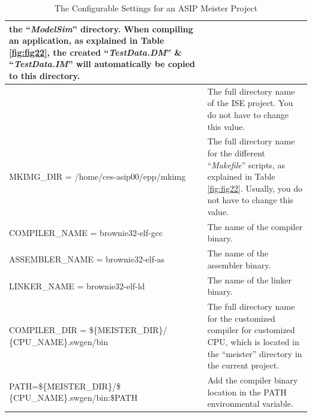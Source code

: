 \begin{table}[!htb]
\begin{tabular}{|p{6cm}|p{11cm}|}
		the ``\emph{ModelSim}'' directory. When compiling an application, as
		explained in Table \ref{fig:fig22}, the created
		``\emph{TestData.DM}'' \& ``\emph{TestData.IM}'' will automatically be
		copied to this directory.
		\\ \hline
		\vtop{\hbox{\strut ISE\_DIR =
				\$\{PROJECT\_}\hbox{\strut DIR\}/\$\{ISE\_NAME \}}} & The full directory
		name of the ISE project. You do not have to change this
		value.
		\\ \hline
		MKIMG\_DIR = /home/ces-asip00/epp/mkimg & The full directory name for the
		different ``\emph{Makefile}'' scripts, as explained in
		Table \ref{fig:fig22}. Usually, you do not have to
		change this value.
		\\ \hline
		COMPILER\_NAME = brownie32-elf-gcc & The name of the compiler
		binary.
		\\ \hline
		ASSEMBLER\_NAME = brownie32-elf-as & The name of the assembler
		binary.
		\\ \hline
		LINKER\_NAME = brownie32-elf-ld & The name of the linker
		binary.
		\\ \hline
		COMPILER\_DIR = \$\{MEISTER\_DIR\}/ \{CPU\_NAME\}.swgen/bin & The full
		directory name for the customized compiler for customized CPU, which is
		located in the ``meister'' directory in the current
		project.
		\\ \hline
		PATH=\$\{MEISTER\_DIR\}/\$ \{CPU\_NAME\}.swgen/bin:\$PATH & Add the
		compiler binary location in the PATH environmental
		variable.
		\\ \hline
	\end{tabular}
	\caption{The Configurable Settings for an ASIP Meister Project}
	\label{fig:fig25}
\end{table}
